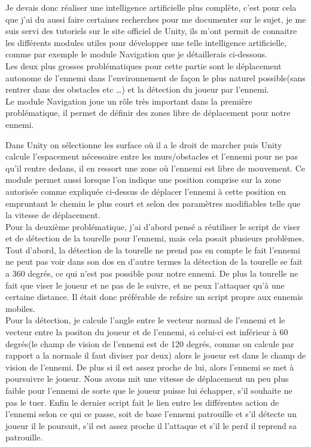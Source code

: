 \documentclass[12pt]{article}
\begin{document}
Je devais donc réaliser une intelligence artificielle plus complète, c'est pour cela que j'ai du aussi faire certaines recherches pour me documenter sur le sujet, je me suis servi des tutoriels sur le site officiel de Unity, ils m'ont permit de connaitre les différents modules utiles pour développer une telle intelligence artificielle, comme par exemple le module \og Navigation \fg{} que je détaillerais ci-dessous.\\

Les deux plus grosses problématiques pour cette partie sont le déplacement autonome de l'ennemi dans l'environnement de façon le plus naturel possible(sans rentrer dans des obstacles etc \ldots) et la détection du joueur par l'ennemi.\\

Le module \og Navigation \fg{} joue un rôle très important dans la première problématique, il permet de définir des zones libre de déplacement pour notre ennemi. 

\newpage

Dans Unity on sélectionne les surface où il a le droit de marcher puis Unity calcule l'espacement nécessaire entre les murs/obstacles et l'ennemi pour ne pas qu'il rentre dedans, il en ressort une zone où l'ennemi est libre de mouvement. Ce module permet aussi lorsque l'on indique une position comprise sur la zone autorisée comme expliquée ci-dessus de déplacer l'ennemi à cette position en empruntant le chemin le plus court et selon des paramètres modifiables telle que la vitesse de déplacement.\\

Pour la deuxième problématique, j'ai d'abord pensé a réutiliser le script de viser et de détection de la tourelle pour l'ennemi, mais cela posait plusieurs problèmes. Tout d'abord, la détection de la tourelle ne prend pas en compte le fait l'ennemi ne peut pas voir dans son dos en d'autre termes la détection de la tourelle se fait a 360 degrés, ce qui n'est pas possible pour notre ennemi. De plus la tourelle ne fait que viser le joueur et ne pas de le suivre, et ne peux l'attaquer qu'à une certaine distance. Il était donc préférable de refaire un script propre aux ennemis mobiles.\\
Pour la détection, je calcule l'angle entre le vecteur normal de l'ennemi et le vecteur entre la positon du joueur et de l'ennemi, si celui-ci est inférieur à 60 degrés(le champ de vision de l'ennemi est de 120 degrés, comme on calcule par rapport a la normale il faut diviser par deux) alors le joueur est dans le champ de vision de l'ennemi. De plus si il est assez proche de lui, alors l'ennemi se met à poursuivre le joueur. Nous avons mit une vitesse de déplacement un peu plus faible pour l'ennemi de sorte que le joueur puisse lui échapper, s'il souhaite ne pas le tuer. Enfin le dernier script fait le lien entre les différentes action de l'ennemi selon ce qui ce passe, soit de base l'ennemi patrouille et s'il détecte un joueur il le poursuit, s'il est assez proche il l'attaque et s'il le perd il reprend sa patrouille.\\
\end{document}
